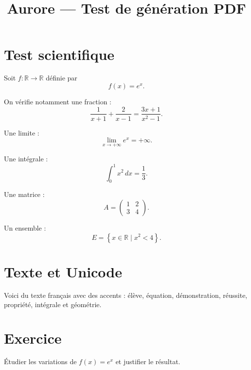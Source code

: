 \documentclass[11pt,a4paper]{article}
\title{Aurore — Test de génération PDF}
\author{}
\date{}
\begin{document}
\maketitle

\section{Test scientifique}

Soit $f : \mathbb{R} \to \mathbb{R}$ définie par
\[
f(x)=e^x.
\]

On vérifie notamment une fraction :
\[
\frac{1}{x+1}+\frac{2}{x-1}
=\frac{3x+1}{x^2-1}.
\]

Une limite :
\[
\lim_{x\to +\infty} e^x=+\infty.
\]

Une intégrale :
\[
\int_0^1 x^2\,dx=\frac{1}{3}.
\]

Une matrice :
\[
A=
\begin{pmatrix}
1 & 2\\
3 & 4
\end{pmatrix}.
\]

Un ensemble :
\[
E=\left\{x\in\mathbb{R}\mid x^2<4\right\}.
\]

\section{Texte et Unicode}

Voici du texte français avec des accents : élève, équation, démonstration,
réussite, propriété, intégrale et géométrie.

\section{Exercice}

Étudier les variations de $f(x)=e^x$ et justifier le résultat.
\end{document}
